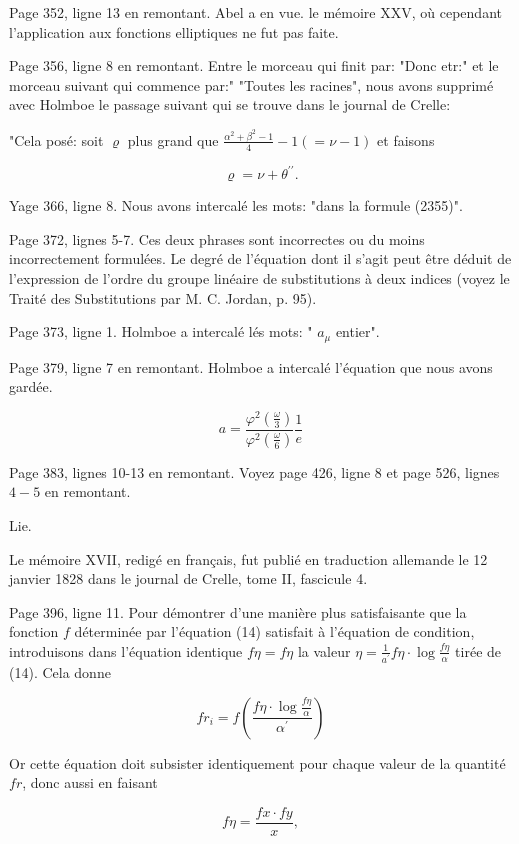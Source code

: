 \documentclass{article}
\begin{document}
Page 352, ligne 13 en remontant. Abel a en vue. le mémoire \(\mathrm{XXV}\), où cependant l'application aux fonctions elliptiques ne fut pas faite.

Page 356, ligne 8 en remontant. Entre le morceau qui finit par: "Donc etr:" et le morceau suivant qui commence par:" "Toutes les racines", nous avons supprimé avec Holmboe le passage suivant qui se trouve dans le journal de Crelle:

"Cela posé: soit \(\varrho\) plus grand que \(\frac{\alpha^{2}+\beta^{2}-1}{4}-1(=\nu-1)\) et faisons

\[
\varrho=\nu+\theta^{\prime \prime} .
\]

Yage 366, ligne 8. Nous avons intercalé les mots: "dans la formule (2355)".

Page 372, lignes 5-7. Ces deux phrases sont incorrectes ou du moins incorrectement formulées. Le degré de l'équation dont il s'agit peut être déduit de l'expression de l'ordre du groupe linéaire de substitutions à deux indices (voyez le Traité des Substitutions par M. C. Jordan, p. 95).

Page 373, ligne 1. Holmboe a intercalé lés mots: " \(a_{\mu}\) entier".

Page 379, ligne 7 en remontant. Holmboe a intercalé l'équation
que nous avons gardée.

\[
a=\frac{\varphi^{2}\left(\frac{\omega}{3}\right)}{\varphi^{2}\left(\frac{\omega}{6}\right)} \frac{1}{e}
\]

Page 383, lignes 10-13 en remontant. Voyez page 426, ligne 8 et page 526, lignes \(4-5\) en remontant.

Lie.

Le mémoire XVII, redigé en français, fut publié en traduction allemande le 12 janvier 1828 dans le journal de Crelle, tome II, fascicule 4.

Page 396, ligne 11. Pour démontrer d'une manière plus satisfaisante que la fonction \(f\) déterminée par l'équation (14) satisfait à l'équation de condition, introduisons dans l'équation identique \(f \eta=f \eta\) la valeur \(\eta=\frac{1}{a^{\prime}} f \eta \cdot \log \frac{f \eta}{\alpha}\) tirée de (14). Cela donne

\[
f r_{i}=f\left(\frac{f \eta \cdot \log \frac{f \eta}{\alpha}}{\alpha^{\prime}}\right)
\]

Or cette équation doit subsister identiquement pour chaque valeur de la quantité \(f r\), donc aussi en faisant

\[
f \eta=\frac{f x \cdot f y}{x},
\]
\end{document}

